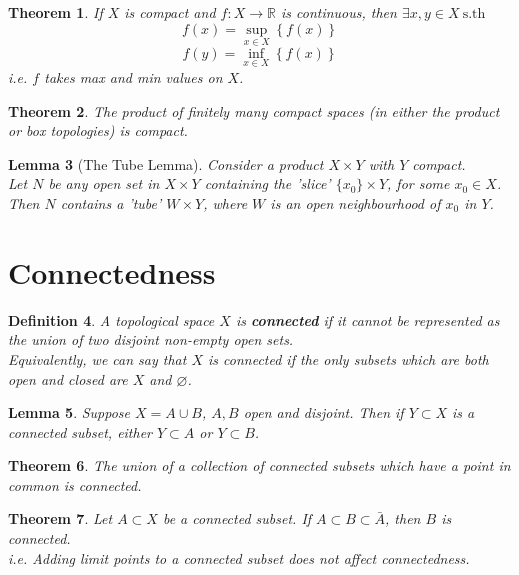 \documentclass{article}
\newcommand{\sth}{\mathrm{s.th}\ }
\newcommand{\R}{\mathbb{R}}
\renewcommand{\emptyset}{\varnothing}
\newtheorem{theorem}{Theorem}[section]
\newtheorem{lemma}[theorem]{Lemma}
\newtheorem{definition}[theorem]{Definition}
\theoremstyle{remark}
\theoremstyle{example}
\theoremstyle{examples}
\begin{document}
	\begin{theorem}
		If $X$ is compact and $f:X \to \R$ is continuous,
		then $\exists x,y \in X\ \sth$
		\[ f(x)=\sup_{x \in X}\left\{f(x)\right\} \]
		\[ f(y)=\inf_{x \in X}\left\{f(x)\right\} \]
		i.e. $f$ takes max and min values on $X$.
	\end{theorem}

	\begin{theorem}
		The product of finitely many compact spaces
		(in either the product or box topologies) is compact.
	\end{theorem}

	\begin{lemma}[The Tube Lemma]
		Consider a product $X \times Y$ with $Y$ compact.\\
		Let $N$ be any open set in $X \times Y$ containing
		the 'slice' $\{x_0\} \times Y$, for some $x_0 \in X$.\\
		Then $N$ contains a 'tube' $W \times Y$, where
		$W$ is an open neighbourhood of $x_0$ in $Y$.
	\end{lemma}

	\pagebreak
	\setcounter{section}{5}
	\section{Connectedness}
	\begin{definition}
		A topological space $X$ is \textbf{connected} if it cannot be
		represented as the union of two disjoint non-empty open sets.\\
		Equivalently, we can say that $X$ is connected if the only subsets
		which are both open and closed are $X$ and $\emptyset$.
	\end{definition}

	\begin{lemma}
		Suppose $X=A \cup B$, $A,B$ open and disjoint.
		Then if $Y \subset X$ is a connected subset, either $Y \subset A$
		or $Y \subset B$.
	\end{lemma}

	\begin{theorem}
		The union of a collection of connected subsets which have a point
		in common is connected.
	\end{theorem}

	\begin{theorem}
		Let $A \subset X$ be a connected subset.
		If $A \subset B \subset \bar{A}$, then $B$ is connected.\\
		i.e. Adding limit points to a connected subset
		does not affect connectedness.
	\end{theorem}
\end{document}
